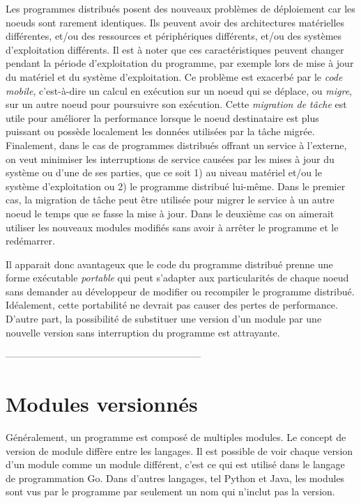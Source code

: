 Les programmes distribués posent des nouveaux problèmes de déploiement
car les noeuds sont rarement identiques.  Ils peuvent avoir des
architectures matérielles différentes, et/ou des ressources et
périphériques différents, et/ou des systèmes d'exploitation
différents.  Il est à noter que ces caractéristiques peuvent changer
pendant la période d'exploitation du programme, par exemple lors de
mise à jour du matériel et du système d'exploitation.  Ce problème est
exacerbé par le \textit{code mobile}, c'est-à-dire un calcul en
exécution sur un noeud qui se déplace, ou \textit{migre}, sur un autre
noeud pour poursuivre son exécution.  Cette \textit{migration de
  tâche} est utile pour améliorer la performance lorsque le noeud
destinataire est plus puissant ou possède localement les données
utilisées par la tâche migrée.  Finalement, dans le cas de programmes
distribués offrant un service à l'externe, on veut minimiser les
interruptions de service causées par les mises à jour du système ou
d'une de ses parties, que ce soit 1) au niveau matériel et/ou le
système d'exploitation ou 2) le programme distribué lui-même.  Dans le
premier cas, la migration de tâche peut être utilisée pour migrer le
service à un autre noeud le temps que se fasse la mise à jour.  Dans
le deuxième cas on aimerait utiliser les nouveaux modules
modifiés sans avoir à arrêter le programme et le redémarrer.

Il apparait donc avantageux que le code du programme distribué prenne
une forme exécutable \textit{portable} qui peut s'adapter aux
particularités de chaque noeud sans demander au développeur de
modifier ou recompiler le programme distribué.  Idéalement, cette
portabilité ne devrait pas causer des pertes de performance.  D'autre
part, la possibilité de substituer une version d'un module par une
nouvelle version sans interruption du programme est attrayante.

------------------------------------------------------------

\section{Modules versionnés}
%
Généralement, un programme est composé de multiples modules.
Le concept de version de
module diffère entre les langages. Il est possible de voir chaque version d'un
module comme un module différent, c'est ce qui est utilisé dans le langage de programmation Go. Dans d'autres langages,
tel Python et Java, les modules sont vus par le programme par seulement
un nom qui n'inclut pas la version.


